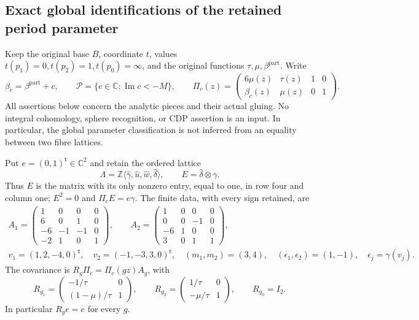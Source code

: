 \subsection{Exact global identifications of the retained period parameter}
\label{wb:pshift:sec:classification}

Keep the original base $B$, coordinate $t$, values
$t(p_1)=0,t(p_2)=1,t(p_0)=\infty$, and the original functions
$\tau,\mu,\beta^{\mathrm{part}}$. Write
\[
 \beta_c=\beta^{\mathrm{part}}+c,\qquad
 \mathcal P=\{c\in\mathbb C:\operatorname{Im}c<-M\},\qquad
 \Pi_c(z)=\begin{pmatrix}6\mu(z)&\tau(z)&1&0\\
                      \beta_c(z)&\mu(z)&0&1\end{pmatrix}.
 \tag{PS1}\label{wb:pshift:eq:periods}
\]
All assertions below concern the analytic pieces and their actual gluing.
No integral cohomology, sphere recognition, or CDP assertion is an input.
In particular, the global parameter classification is not inferred from
an equality between two fibre lattices.

Put $e=(0,1)^{\mathsf t}\in\mathbb C^2$ and retain the ordered lattice
\[
 \Lambda=\mathbb Z\langle\widehat\gamma,\widehat u,
                        \widehat w,\widehat\delta\rangle,
 \qquad E=\widehat\delta\otimes\gamma.
 \tag{PS2}\label{wb:pshift:eq:rank-one-map}
\]
Thus $E$ is the matrix with its only nonzero entry, equal to one, in
row four and column one; $E^2=0$ and $\Pi_cE=e\gamma$.
The finite data, with every sign retained, are
\[
\begin{gathered}
 A_1=\begin{pmatrix}1&0&0&0\\6&0&1&0\\-6&-1&-1&0\\-2&1&0&1\end{pmatrix},
 \qquad
 A_2=\begin{pmatrix}1&0&0&0\\0&0&-1&0\\-6&1&0&0\\3&0&1&1\end{pmatrix},\\
 v_1=(1,2,-4,0)^{\mathsf t},\quad
 v_2=(-1,-3,3,0)^{\mathsf t},\quad
 (m_1,m_2)=(3,4),\quad
 (\epsilon_1,\epsilon_2)=(1,-1),\quad \epsilon_j=\gamma(v_j).
\end{gathered}
\tag{PS3}\label{wb:pshift:eq:finite-data}
\]
The covariance is $R_g\Pi_c=\Pi_c(gz)A_g$, with
\[
 R_{g_1}=\begin{pmatrix}-1/\tau&0\\(1-\mu)/\tau&1\end{pmatrix},\qquad
 R_{g_2}=\begin{pmatrix}1/\tau&0\\-\mu/\tau&1\end{pmatrix},\qquad
 R_{g_0}=I_2.
 \tag{PS4}\label{wb:pshift:eq:covariance}
\]
In particular $R_ge=e$ for every $g$.

